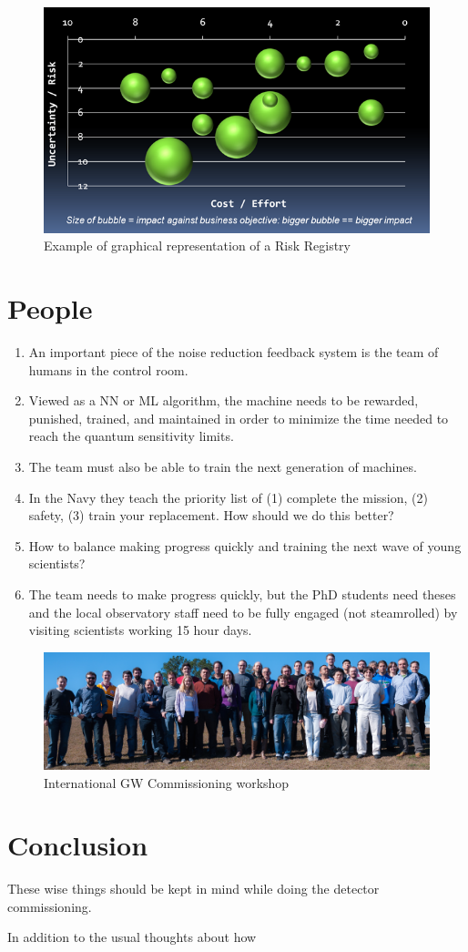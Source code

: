 \begin{figure}[h]
\centering
\includegraphics[width=\columnwidth]{Figures/RIPBubbleChartNoOverlays.png}
\caption{Example of graphical representation of a Risk Registry}
\label{fig:RiskBubbles}
\end{figure}


\section{People}
\begin{enumerate}
\item An important piece of the noise reduction feedback system is the team of humans 
  in the control room.
\item Viewed as a NN or ML algorithm, the machine needs to be rewarded, punished, trained, and 
  maintained in order to minimize the time needed to reach the quantum sensitivity limits.
\item The team must also be able to train the next generation of machines.
\item In the Navy they teach the priority list of (1) complete the mission, 
  (2) safety, (3) train your replacement. How should we do this better?
\item How to balance making progress quickly and training the next wave of young scientists?
\item The team needs to make progress quickly, but the PhD students need theses and the local
  observatory staff need to be fully engaged (not steamrolled) by visiting scientists working 15 hour days.
\end{enumerate}

\begin{figure}[h]
\centering
\includegraphics[width=\columnwidth]{Figures/GroupPhoto_LLOworkshop13.jpg}
\caption{International GW Commissioning workshop}
\label{fig:workshopPhotoLLO}
\end{figure}

\section{Conclusion}
These wise things should be kept in mind while doing the detector commissioning.

In addition to the usual thoughts about how



